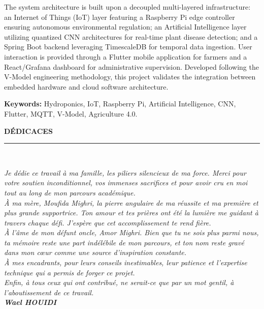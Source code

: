 \documentclass[a4paper,12pt,twoside]{report}
\begin{document}
The system architecture is built upon a decoupled multi-layered infrastructure: an Internet of Things (IoT) layer featuring a Raspberry Pi edge controller ensuring autonomous environmental regulation; an Artificial Intelligence layer utilizing quantized CNN architectures for real-time plant disease detection; and a Spring Boot backend leveraging TimescaleDB for temporal data ingestion. User interaction is provided through a Flutter mobile application for farmers and a React/Grafana dashboard for administrative supervision. Developed following the V-Model engineering methodology, this project validates the integration between embedded hardware and cloud software architecture.

\noindent\textbf{Keywords:} Hydroponics, IoT, Raspberry Pi, Artificial Intelligence, CNN, Flutter, MQTT, V-Model, Agriculture 4.0.

\clearpage
\thispagestyle{preStyle}
\null\vspace*{\fill}
\begin{center}
  {\fontsize{26}{30}\selectfont\bfseries DÉDICACES}\\[1cm]
  \rule{0.5\textwidth}{0.5pt}\\[1.5cm]
\end{center}
\begin{flushright}
  \itshape
  Je dédie ce travail à ma famille, les piliers silencieux de ma force. Merci pour votre soutien inconditionnel, vos immenses sacrifices et pour avoir cru en moi tout au long de mon parcours académique.\\[0.5cm]
  
  À ma mère, Moufida Mighri, la pierre angulaire de ma réussite et ma première et plus grande supportrice. Ton amour et tes prières ont été la lumière me guidant à travers chaque défi. J'espère que cet accomplissement te rend fière.\\[0.5cm]
  
  À l'âme de mon défunt oncle, Amor Mighri. Bien que tu ne sois plus parmi nous, ta mémoire reste une part indélébile de mon parcours, et ton nom reste gravé dans mon cœur comme une source d'inspiration constante.\\[0.5cm]
  
  À mes encadrants, pour leurs conseils inestimables, leur patience et l'expertise technique qui a permis de forger ce projet.\\[0.5cm]
  
  Enfin, à tous ceux qui ont contribué, ne serait-ce que par un mot gentil, à l'aboutissement de ce travail.\\[0.8cm]
  
  \textbf{\Large Wael HOUIDI}
\end{flushright}
\vspace*{\fill}
\end{document}
